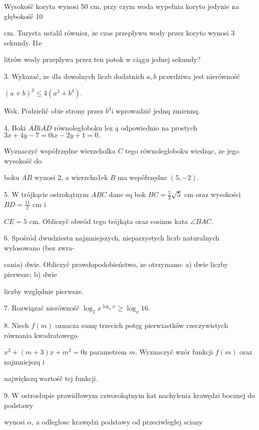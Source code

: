 \documentclass[a4paper,12pt]{article}
\begin{document}
Wysokośč koryta wynosi 50 cm, przy czym woda wypełnia koryto jedynie na głębokośč 10

cm. Turysta ustalil równiez, $\dot{\mathrm{z}}\mathrm{e}$ czas przepływu wody przez koryto wynosi 3 sekundy. I1e

litrów wody przeplywa przez ten potok $\mathrm{w}$ ciągu jednej sekundy?

3. Wykazač, $\dot{\mathrm{z}}\mathrm{e}$ dla dowolnych liczb dodatnich $a, b$ prawdziwa jest nierównośč

$(a+b)^{3}\leq 4(a^{3}+b^{3}).$

Wsk. Podzielič obie strony przez $b^{3}\mathrm{i}$ wprowadzič jednq zmiennq.

4. Boki $\overline{AB}\mathrm{i}\overline{AD}$ równoległoboku $\mathrm{l}\mathrm{e}\dot{\mathrm{z}}$ ą odpowiednio na prostych $3x+4y-7=0\mathrm{i}x-2y+1=0.$

Wyznaczyč współrzędne wierzcholka $C$ tego równolegloboku wiedząc, $\dot{\mathrm{z}}\mathrm{e}$ jego wysokośč do

boku $\overline{AB}$ wynosi 2, a wierzcho1ek $B$ ma współrzędne $(5,-2).$

5. $\mathrm{W}$ trójkącie ostrokątnym $ABC$ dane sq bok $BC=\displaystyle \frac{5}{2}\sqrt{5}$ cm oraz wysokości $BD=\displaystyle \frac{11}{2}$ cm $\mathrm{i}$

$CE=5$ cm. Obliczyč obwód tego trójkąta oraz cosinus kata $\angle BAC.$

6. Spośród dwudziestu najmniejszych, nieparzystych liczb naturalnych wylosowano (bez zwra-

cania) dwie. Obliczyč prawdopodobieństwo, $\dot{\mathrm{z}}\mathrm{e}$ otrzymano: a) dwie liczby pierwsze; b) dwie

liczby względnie pierwsze.

7. Rozwiązač nierównośč $\log_{2} x^{\log_{4}x}\geq\log_{x}16.$

8. Niech $f(m)$ oznacza sumę trzecich potęg pierwiastków rzeczywistych równania kwadratowego

$x^{2}+(m+3)x+m^{2}=0\mathrm{z}$ parametrem $m$. Wyznaczyč wzór funkcji $f(m)$ oraz najmniejszq $\mathrm{i}$

największq wartośč tej funkcji.

9. $\mathrm{W}$ ostrosłupie prawidłowym czworokątnym $\mathrm{k}\mathrm{a}\mathrm{t}$ nachylenia krawędzi bocznej do podstawy

wynosi $\alpha$, a odległosc krawędzi podstawy od przeciwległej sciany
\end{document}
